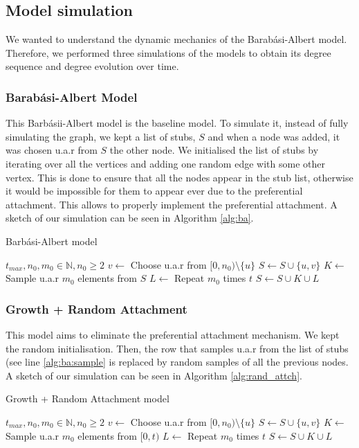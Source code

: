 \subsection{Model simulation}
We wanted to understand the dynamic mechanics of the Barabási-Albert model. Therefore, we performed three simulations of the models to obtain its degree sequence and degree evolution over time.
\subsubsection{Barabási-Albert Model}
This Barbásii-Albert model is the baseline model. To simulate it, instead of fully simulating the graph, we kept a list of stubs, $S$ and when a node was added, it was chosen u.a.r from $S$ the other node. We initialised the list of stubs by iterating over all the vertices and adding one random edge with some other vertex. This is done to ensure that all the nodes appear in the stub list, otherwise it would be impossible for them to appear ever due to the preferential attachment. This allows to properly implement the preferential attachment. A sketch of our simulation can be seen in Algorithm \ref{alg:ba}.
\begin{algorithm}[!htb]
\caption{Barbási-Albert model}\label{alg:ba}
\begin{algorithmic}
\Require $t_{max}, n_0, m_0 \in \mathbb{N}, n_0 \geq 2$
\For{$u \in [0,n_0)$} 
    \State $v \gets $ Choose u.a.r from $[0,n_0) \setminus \{u\}$
    \State $S \gets S \cup \{u,v\}$
\EndFor
\For{$t \in [n_0,n_0+t_{max})$}
    \State $K \gets$ Sample u.a.r $m_0$ elements from $S$ \label{alg:ba:sample}
    \State $L \gets$ Repeat $m_0$ times $t$
    \State $S \gets S \cup K \cup L$
\EndFor
\end{algorithmic}
\end{algorithm}

\subsubsection{Growth + Random Attachment}
This model aims to eliminate the preferential attachment mechanism. We kept the random initialisation. Then, the row that samples u.a.r from the list of stubs (see line \ref{alg:ba:sample} is replaced by random samples of all the previous nodes. A sketch of our simulation can be seen in Algorithm \ref{alg:rand_attch}.

\begin{algorithm}[!htb]
\caption{Growth + Random Attachment model}\label{alg:rand_attch}
\begin{algorithmic}
\Require $t_{max}, n_0, m_0 \in \mathbb{N}, n_0 \geq 2$
\For{$u \in [0,n_0)$} 
    \State $v \gets $ Choose u.a.r from $[0,n_0) \setminus \{u\}$
    \State $S \gets S \cup \{u,v\}$
\EndFor
\For{$t \in [n_0,n_0+t_{max})$}
    \State $K \gets$ Sample u.a.r $m_0$ elements from $[0,t)$
    \State $L \gets$ Repeat $m_0$ times $t$
    \State $S \gets S \cup K \cup L$
\EndFor
\end{algorithmic}
\end{algorithm}


